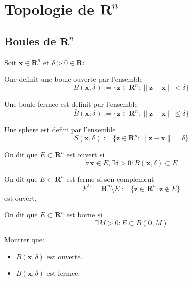 \section{Topologie de \texorpdfstring{$\mathbf{R}^{n}$}{Rn}}
\subsection{Boules de \texorpdfstring{$\mathbf{R}^{n}$}{Rn}}

Soit  $\boldsymbol{x}\in \mathbf{R}^{n}$ et $\delta>0\in \mathbf{R}$:
\begin{definition}
One definit une boule ouverte par l'ensemble
$$
B(\boldsymbol{x},\delta):= \{ \boldsymbol{z}\in \mathbf{R}^{n}:\lVert \boldsymbol{z}-\boldsymbol{x} \rVert <\delta \}
$$
\end{definition}
\begin{definition}
Une boule fermee est definit par l'ensemble
$$
\bar{B}(\boldsymbol{x},\delta):= \{ \boldsymbol{z}\in \mathbf{R}^{n}:\lVert \boldsymbol{z}-\boldsymbol{x} \rVert \leq\delta \}
$$
\end{definition}
\begin{definition}[Sphere]
Une sphere est defini par l'ensemble
$$
S(\boldsymbol{x},\delta):= \{ \boldsymbol{z}\in \mathbf{R}^{n}:\lVert \boldsymbol{z}-\boldsymbol{x} \rVert =\delta \}
$$
\end{definition}
\begin{definition}
On dit que $E\subset \mathbf{R}^{n}$ est ouvert si 
$$
\forall \boldsymbol{x}\in E,\exists\delta>0:B(\boldsymbol{x},\delta)\subset E
$$
\end{definition}
\begin{definition}
On dit que $E\subset \mathbf{R}^{n}$ est ferme si son complement $$E^{C}=\mathbf{R}^{n}\setminus E:= \{ \boldsymbol{z}\in \mathbf{R}^{n}:\boldsymbol{z}\not\in E \}$$
est ouvert.
\end{definition}
\begin{definition}
On dit que $E\subset \mathbf{R}^{n}$ est borne si
$$
\exists M>0:E\subset B(\boldsymbol{0},M)
$$
\end{definition}
\begin{exercise}
Montrer que:
\begin{itemize}
\item $B(\boldsymbol{x},\delta)$ est ouverte.
\item $\bar{B}(\boldsymbol{x},\delta)$ est fermee.
\end{itemize}
\end{exercise}

